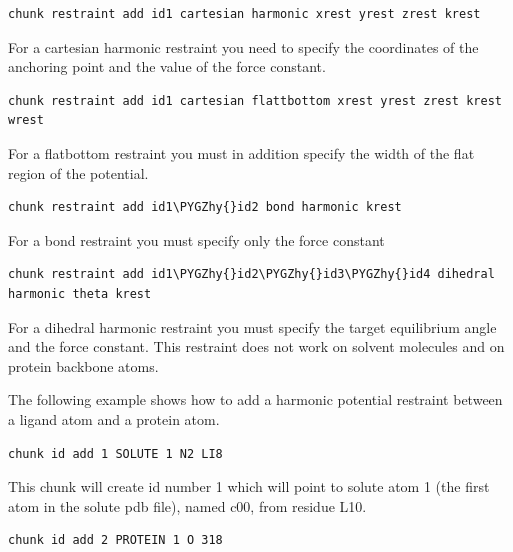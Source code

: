 \documentclass[letterpaper,10pt,english]{sphinxmanual}
\def\PYGZhy{\char`\-}
\begin{document}
\begin{Verbatim}[commandchars=\\\{\}]
chunk restraint add id1 cartesian harmonic xrest yrest zrest krest
\end{Verbatim}

For a cartesian harmonic restraint you need to specify the coordinates of the anchoring point and the value of the force constant.

\begin{Verbatim}[commandchars=\\\{\}]
chunk restraint add id1 cartesian flattbottom xrest yrest zrest krest wrest
\end{Verbatim}

For a flatbottom restraint you must in addition specify the width of the flat region of the potential.

\begin{Verbatim}[commandchars=\\\{\}]
chunk restraint add id1\PYGZhy{}id2 bond harmonic krest
\end{Verbatim}

For a bond restraint you must specify only the force constant

\begin{Verbatim}[commandchars=\\\{\}]
chunk restraint add id1\PYGZhy{}id2\PYGZhy{}id3\PYGZhy{}id4 dihedral harmonic theta krest
\end{Verbatim}

For a dihedral harmonic restraint you must specify the target equilibrium angle and the force constant. This restraint does not work on solvent molecules and on protein backbone atoms.

The following example shows how to add a harmonic potential restraint between a ligand atom and a protein atom.

\begin{Verbatim}[commandchars=\\\{\}]
chunk id add 1 SOLUTE 1 N2 LI8
\end{Verbatim}

This chunk will create id number 1 which will point to solute atom 1 (the first atom in the solute pdb file), named c00, from residue L10.

\begin{Verbatim}[commandchars=\\\{\}]
chunk id add 2 PROTEIN 1 O 318
\end{Verbatim}
\end{document}
